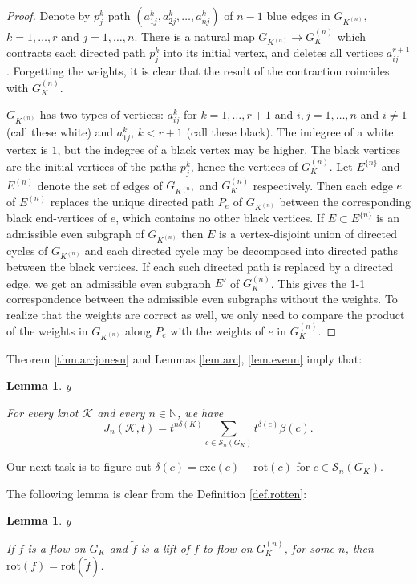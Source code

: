 \documentclass{amsart}
\theoremstyle{plain}
\newtheorem{lemma}[proposition]{Lemma}
\theoremstyle{definition}
\theoremstyle{remark}
\def\printname#1{
        \if\draft y
                \smash{\makebox[0pt]{\hspace{-0.5in}
                        \raisebox{8pt}{\tt\tiny #1}}}
        \fi
}
\def\lbl#1{\label{#1}\printname{#1}}
\def\BN{\mathbb N}
\def\K{\mathcal K}
\def\d{\delta}
\def\b{\beta}
\def\ti{\widetilde}
\def\rot{\mathrm{rot}}
\def\longto{\longrightarrow}
\def\Sev{{\mathcal S}}
\def\exc{\mathrm{exc}}
\def\longto{\longrightarrow}
\begin{document}
\begin{proof}
Denote by $p^k_j$ path $(a^k_{1j},a^k_{2j}, \dots, a^k_{nj})$ of $n-1$
blue edges in $G_{K^{(n)}}$, $k=1,\dots, r$ and $j=1,\dots,n$. 
There is a natural map $G_{K^{(n)}}\longto G_K^{(n)}$ which contracts each 
directed path $p^k_j$ into its initial vertex, and deletes all vertices 
$a^{r+1}_{ij}$.
Forgetting the weights, it is clear that the result of the contraction
coincides with $G_K^{(n)}$.

$G_{K^{(n)}}$ has two types of vertices: $a^k_{ij}$ for
$k=1,\dots, r+1$ and $i,j=1,\dots,n$ and $i \neq 1$ (call these white)
and $a^k_{1j}$, $k< r+1$ (call these black). The indegree of a white vertex 
is $1$, but the indegree of a black vertex may be higher. The black vertices
are the initial vertices of the paths $p^k_j$, hence the vertices
of $G_K^{(n)}$. Let $E^{\{n\}}$ and $E^{(n)}$ denote the set of edges of 
$G_{K^{(n)}}$ 
and $G_K^{(n)}$ respectively. Then each edge $e$ of $E^{(n)}$ replaces the 
unique 
directed path $P_e$ of $G_{K^{(n)}}$ between the corresponding black 
end-vertices of $e$, 
which contains no other black vertices.
If $E \subset E^{\{n\}}$ is an admissible even subgraph of $G_{K^{(n)}}$ 
then $E$ is a vertex-disjoint union of directed cycles of  $G_{K^{(n)}}$
and each directed cycle may be decomposed into directed paths between the 
black vertices.
If each such directed path is replaced by a directed edge, we get an admissible
even subgraph $E'$ of $G_K^{(n)}$. This gives the 1-1 correspondence between 
the admissible even subgraphs without the weights. To realize that the 
weights are correct as well, we only need to compare the product of the 
weights in $G_{K^{(n)}}$ along $P_e$ with the weights of $e$ in $G_K^{(n)}$.
\end{proof}

Theorem \ref{thm.arcjonesn} and Lemmas \ref{lem.arc}, \ref{lem.evenn} 
imply that:

\begin{lemma}
\lbl{lem.arcjonesnn}
For every knot $\K$ and every $n \in \BN$, we have
$$
J_n(\K, t)=
t^{n \d(K)} \sum_{c \in \Sev_n(G_K)} t^{\d(c)} \b(c). 
$$
\end{lemma}

Our next task is to figure out $\d(c)=\exc(c)-\rot(c)$ for $c\in \Sev_n(G_K)$. 

The following lemma is clear from the Definition \ref{def.rotten}: 

\begin{lemma}
\lbl{lem.rot}
If $f$ is a flow on $G_K$ and $\ti f$ is a lift
of $f$ to flow on $G_K^{(n)}$,
for some $n$, then $\rot(f)=\rot(\ti f)$.
\end{lemma}
\end{document}

